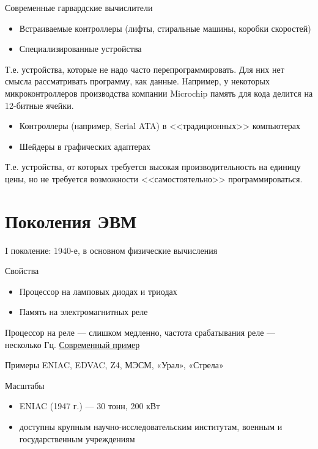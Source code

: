 \documentclass[xetex,aspectratio=43]{beamer}
\begin{document}
\begin{frame}{Современные гарвардские вычислители}
	\begin{itemize}
		\item
		Встраиваемые контроллеры (лифты, стиральные машины, коробки скоростей)
		\item
		Специализированные устройства
	\end{itemize}

		Т.е. устройства, которые не надо часто перепрограммировать. Для них нет
		смысла рассматривать программу, как данные. Например, у некоторых
		микроконтроллеров производства компании Microchip память для кода
		делится на 12-битные ячейки.

	\pause

	\begin{itemize}
		\item Контроллеры (например, Serial ATA) в <<традиционных>> компьютерах
		\item Шейдеры в графических адаптерах
	\end{itemize}

	Т.е. устройства, от которых требуется высокая производительность на единицу цены,
	но не требуется возможности <<самостоятельно>> программироваться.

\end{frame}

\section{Поколения ЭВМ}

\begin{frame}{I поколение: 1940-е, в основном физические вычисления}

	\begin{block}{Свойства}
		\begin{itemize}
			\item
			Процессор на ламповых диодах и триодах
			\item
			Память на электромагнитных реле
		\end{itemize}

		Процессор на реле --- слишком медленно, частота срабатывания реле ---
		несколько Гц. \href{\ytlink{5hhbGBlP3_4}}{Современный пример}
	\end{block}

	\begin{block}{Примеры}
		ENIAC, EDVAC, Z4, МЭСМ, «Урал», «Стрела»
	\end{block}

	\begin{block}{Масштабы}
		\begin{itemize}
			\item
			ENIAC (1947 г.) --- 30 тонн, 200 кВт
			\item
			доступны крупным научно-исследовательским институтам, военным и
			государственным учреждениям
		\end{itemize}
	\end{block}
\end{frame}
\end{document}
